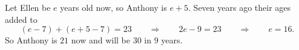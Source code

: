 Let Ellen be $e$ years old now, so Anthony is $e+5$. Seven years ago their ages added to
\[
(e-7)+(e+5-7)=23\qquad\Longrightarrow\qquad 2e-9=23\qquad\Longrightarrow\qquad e=16 .
\]
So Anthony is $21$ now and will be $30$ in $\boxed{9}$ years.
